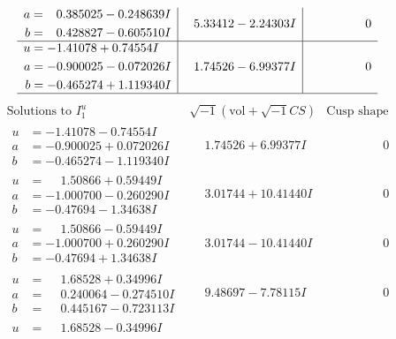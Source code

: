 \documentclass[1p]{elsarticle_modified}
\theoremstyle{definition}
\newcommand{\I}{\sqrt{-1}}
\begin{document}
$$\begin{array}{c|c|c}
\begin{aligned}
a &= \phantom{-}0.385025 - 0.248639 I \\
b &= \phantom{-}0.428827 - 0.605510 I\end{aligned}
 & \phantom{-}5.33412 - 2.24303 I & \phantom{-0.000000 } 0 \\ \hline\begin{aligned}
u &= -1.41078 + 0.74554 I \\
a &= -0.900025 - 0.072026 I \\
b &= -0.465274 + 1.119340 I\end{aligned}
 & \phantom{-}1.74526 - 6.99377 I & \phantom{-0.000000 } 0\\
 \hline 
 \end{array}$$\newpage$$\begin{array}{c|c|c}  
\text{Solutions to }I^u_{1}& \I (\text{vol} + \sqrt{-1}CS) & \text{Cusp shape}\\
 \hline 
\begin{aligned}
u &= -1.41078 - 0.74554 I \\
a &= -0.900025 + 0.072026 I \\
b &= -0.465274 - 1.119340 I\end{aligned}
 & \phantom{-}1.74526 + 6.99377 I & \phantom{-0.000000 } 0 \\ \hline\begin{aligned}
u &= \phantom{-}1.50866 + 0.59449 I \\
a &= -1.000700 - 0.260290 I \\
b &= -0.47694 - 1.34638 I\end{aligned}
 & \phantom{-}3.01744 + 10.41440 I & \phantom{-0.000000 } 0 \\ \hline\begin{aligned}
u &= \phantom{-}1.50866 - 0.59449 I \\
a &= -1.000700 + 0.260290 I \\
b &= -0.47694 + 1.34638 I\end{aligned}
 & \phantom{-}3.01744 - 10.41440 I & \phantom{-0.000000 } 0 \\ \hline\begin{aligned}
u &= \phantom{-}1.68528 + 0.34996 I \\
a &= \phantom{-}0.240064 - 0.274510 I \\
b &= \phantom{-}0.445167 - 0.723113 I\end{aligned}
 & \phantom{-}9.48697 - 7.78115 I & \phantom{-0.000000 } 0 \\ \hline\begin{aligned}
u &= \phantom{-}1.68528 - 0.34996 I \\

\end{aligned}
\end{array}$$
\end{document}
